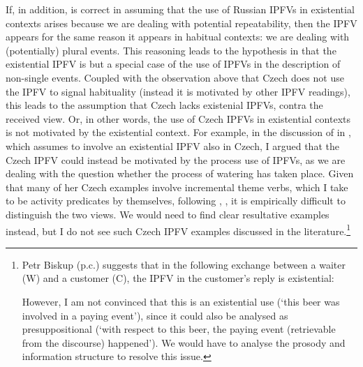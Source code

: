 \documentclass[output=paper,colorlinks,citecolor=brown]{langscibook}
\begin{document}
If, in addition, \citet{paduceva96} is correct in assuming that the use of Russian IPFVs in existential contexts arises because we are dealing with potential repeatability, then the IPFV appears for the same reason it appears in habitual contexts: we are dealing with (potentially) plural events. This reasoning leads to the hypothesis in \citet{gehrke02,gehrke22} that the existential IPFV is but a special case of the use of IPFVs in the description of non-single events. Coupled with the observation above that Czech does not use the IPFV to signal habituality (instead it is motivated by other IPFV readings), this leads to the assumption that Czech lacks existenial IPFVs, contra the received view. Or, in other words, the use of Czech IPFVs in existential contexts is not motivated by the existential context. For example, in the discussion of  in , which \citet{klimek22} assumes to involve an existential IPFV also in Czech, I argued that the Czech IPFV could instead be motivated by the process use of IPFVs, as we are dealing with the question whether the process of watering has taken place. Given that many of her Czech examples involve incremental theme verbs, which I take to be activity predicates by themselves, following \citet{rappaportlevin10}, \citet{kennedyincr}, it is empirically difficult to distinguish the two views. We would need to find clear resultative examples instead, but I do not see such Czech IPFV examples discussed in the literature.\footnote{Petr Biskup (p.c.) suggests that in the following exchange between a waiter (W) and a customer (C), the IPFV in the customer's reply is existential:

\ea\label{ex:waiter}
\begin{xlist}
\end{xlist}
\z 

\noindent However, I am not convinced that this is an existential use (`this beer was involved in a paying event'), since it could also be analysed as presuppositional (`with respect to this beer, the paying event (retrievable from the discourse) happened'). We would have to analyse the prosody and information structure to resolve this issue.}
\end{document}
